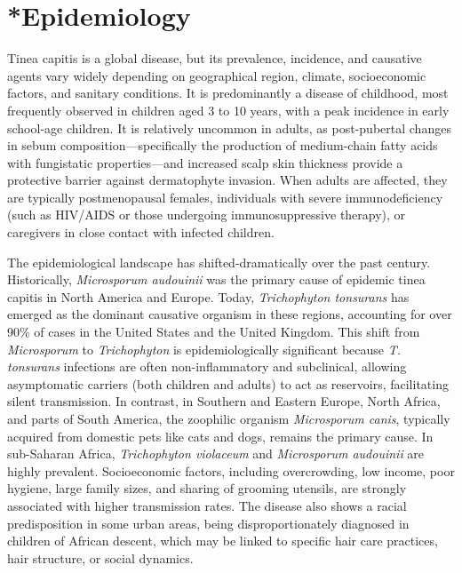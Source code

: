 \section{*Epidemiology}
Tinea capitis is a global disease, but its prevalence, incidence, and causative agents vary widely depending on geographical region, climate, socioeconomic factors, and sanitary conditions. It is predominantly a disease of childhood, most frequently observed in children aged 3 to 10 years, with a peak incidence in early school-age children. It is relatively uncommon in adults, as post-pubertal changes in sebum composition---specifically the production of medium-chain fatty acids with fungistatic properties---and increased scalp skin thickness provide a protective barrier against dermatophyte invasion. When adults are affected, they are typically postmenopausal females, individuals with severe immunodeficiency (such as HIV/AIDS or those undergoing immunosuppressive therapy), or caregivers in close contact with infected children.

The epidemiological landscape has shifted-dramatically over the past century. Historically, \textit{Microsporum audouinii} was the primary cause of epidemic tinea capitis in North America and Europe. Today, \textit{Trichophyton tonsurans} has emerged as the dominant causative organism in these regions, accounting for over 90\% of cases in the United States and the United Kingdom. This shift from \textit{Microsporum} to \textit{Trichophyton} is epidemiologically significant because \textit{T. tonsurans} infections are often non-inflammatory and subclinical, allowing asymptomatic carriers (both children and adults) to act as reservoirs, facilitating silent transmission. In contrast, in Southern and Eastern Europe, North Africa, and parts of South America, the zoophilic organism \textit{Microsporum canis}, typically acquired from domestic pets like cats and dogs, remains the primary cause. In sub-Saharan Africa, \textit{Trichophyton violaceum} and \textit{Microsporum audouinii} are highly prevalent. Socioeconomic factors, including overcrowding, low income, poor hygiene, large family sizes, and sharing of grooming utensils, are strongly associated with higher transmission rates. The disease also shows a racial predisposition in some urban areas, being disproportionately diagnosed in children of African descent, which may be linked to specific hair care practices, hair structure, or social dynamics.

